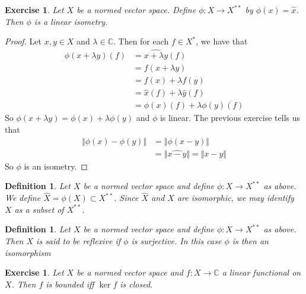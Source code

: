\documentclass[12pt]{amsart}
\newtheorem{defn}[thm]{Definition}
\newtheorem{ex}[thm]{Exercise}
\newcommand{\lam}{\lambda}
\newcommand{\C}{\mathbb{C}}
\newcommand{\n}{\Vert}
\begin{document}
\begin{ex}
Let $X$ be a normed vector space. Define $\phi : X \rightarrow X^{**}$ by $\phi(x) = \hat{x}$. Then $\phi$ is a linear isometry. 
\end{ex}

\begin{proof}
Let $x,y \in X$ and $\lam \in \C$. Then for each $f \in X^*$, we have that 
\begin{align*}
\phi(x+ \lam y)(f) 
&= \widehat{x+ \lam y}(f) \\
&= f(x+\lam y) \\
&= f(x) + \lam f(y) \\
&= \hat{x}(f) + \lam \hat{y}(f)\\
&= \phi(x)(f) + \lam \phi(y)(f)
\end{align*} 
So $\phi(x+ \lam y) = \phi(x) + \lam \phi(y)$ and $\phi$ is linear. The previous exercise tells us that 
\begin{align*}
\n \phi(x) - \phi(y) \n 
&= \n \phi(x-y)\n \\
&= \n \widehat{x-y} \n = \n x-y \n
\end{align*}
So $\phi$ is an isometry.
\end{proof}

\begin{defn}
Let $X$ be a normed vector space and define $\phi:X \rightarrow X^{**}$ as above. We define $\widehat{X} = \phi(X) \subset X^{**}$. Since $\widehat{X}$ and $X$ are isomorphic, we may identify $X$ as a subset of $X^{**}$. 
\end{defn}

\begin{defn}
Let $X$ be a normed vector space and define $\phi:X \rightarrow X^{**}$ as above. Then $X$ is said to be reflexive if $\phi$ is surjective. In this case $\phi$ is then an isomorphism
\end{defn}

\begin{ex}
Let $X$ be a normed vector space and $f:X \rightarrow \C$ a linear functional on $X$. Then $f$ is bounded iff $\ker f$ is closed. 
\end{ex}
\end{document}
